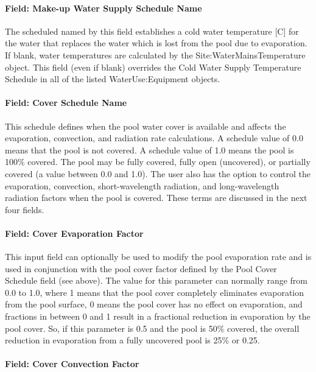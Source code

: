 \paragraph{Field: Make-up Water Supply Schedule Name}\label{field-make-up-water-supply-schedule-name}

The scheduled named by this field establishes a cold water temperature {[}C{]} for the water that replaces the water which is lost from the pool due to evaporation. If blank, water temperatures are calculated by the Site:WaterMainsTemperature object. This field (even if blank) overrides the Cold Water Supply Temperature Schedule in all of the listed WaterUse:Equipment objects.

\paragraph{Field: Cover Schedule Name}\label{field-cover-schedule-name}

This schedule defines when the pool water cover is available and affects the evaporation, convection, and radiation rate calculations. A schedule value of 0.0 means that the pool is not covered. A schedule value of 1.0 means the pool is 100\% covered. The pool may be fully covered, fully open (uncovered), or partially covered (a value between 0.0 and 1.0). The user also has the option to control the evaporation, convection, short-wavelength radiation, and long-wavelength radiation factors when the pool is covered. These terms are discussed in the next four fields.

\paragraph{Field: Cover Evaporation Factor}\label{field-cover-evaporation-factor}

This input field can optionally be used to modify the pool evaporation rate and is used in conjunction with the pool cover factor defined by the Pool Cover Schedule field (see above). The value for this parameter can normally range from 0.0 to 1.0, where 1 means that the pool cover completely eliminates evaporation from the pool surface, 0 means the pool cover has no effect on evaporation, and fractions in between 0 and 1 result in a fractional reduction in evaporation by the pool cover. So, if this parameter is 0.5 and the pool is 50\% covered, the overall reduction in evaporation from a fully uncovered pool is 25\% or 0.25.

\paragraph{Field: Cover Convection Factor}\label{field-cover-convection-factor}

